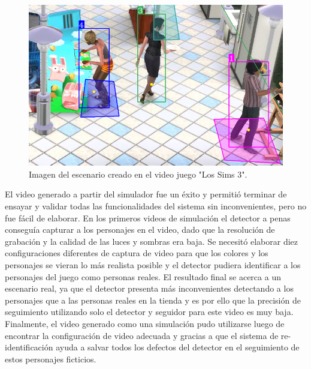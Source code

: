 \begin{figure}[ht]
	\centering
	\includegraphics[scale=.50]{./Figures/sims.png}
	\caption{Imagen del escenario creado en el video juego "Los Sims 3".}
	\label{fig:sims}
\end{figure}

\newpage

El video generado a partir del simulador fue un éxito y permitió terminar de ensayar y validar todas las funcionalidades del sistema sin inconvenientes, pero no fue fácil de elaborar. En los primeros videos de simulación el detector a penas conseguía capturar a los personajes en el video, dado que la resolución de grabación y la calidad de las luces y sombras era baja. Se necesitó elaborar diez configuraciones diferentes de captura de video para que los colores y los personajes se vieran lo más realista posible y el detector pudiera identificar a los personajes del juego como personas reales. El resultado final \citep{DEMO:2} se acerca a un escenario real, ya que el detector presenta más inconvenientes detectando a los personajes que a las personas reales en la tienda y es por ello que la precisión de seguimiento utilizando solo el detector y seguidor para este video es muy baja. Finalmente, el video generado como una simulación pudo utilizarse luego de encontrar la configuración de video adecuada y gracias a que el sistema de re-identificación ayuda a salvar todos los defectos del detector en el seguimiento de estos personajes ficticios.

\newpage


